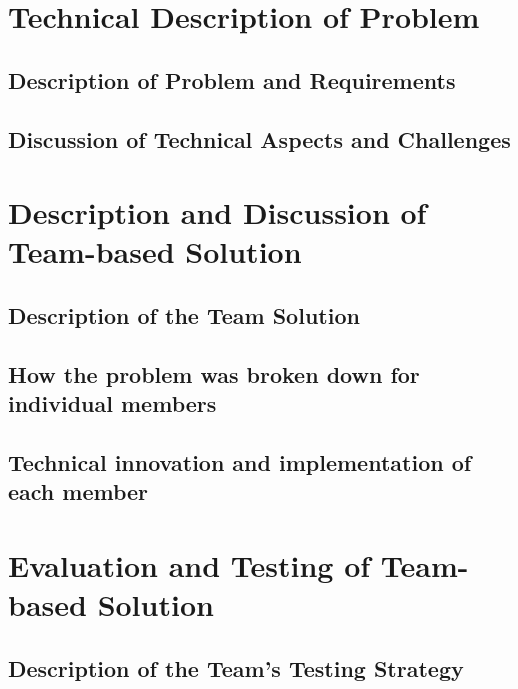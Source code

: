 \documentclass[a4paper]{report}
\begin{document}
\chapter{Technical Description of Problem} 
\section{Description of Problem and Requirements}
\section{Discussion of Technical Aspects and Challenges}

\chapter{Description and Discussion of Team-based Solution} 
\section{Description of the Team Solution}
\section{How the problem was broken down for individual members}
\section{Technical innovation and implementation of each member}

\chapter{Evaluation and Testing of Team-based Solution} 
\section{Description of the Team's Testing Strategy}
\end{document}
